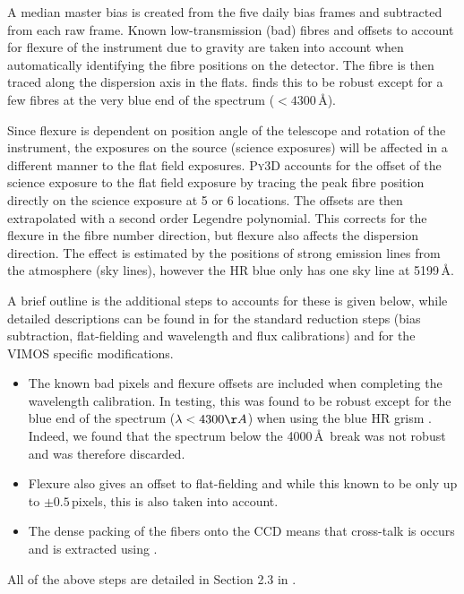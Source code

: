 		A median master bias is created from the five daily bias frames and subtracted from each raw frame. Known low-transmission (bad) fibres and offsets to account for flexure of the instrument due to gravity are taken into account when automatically identifying the fibre positions on the detector. The fibre is then traced along the dispersion axis in the flats. \citet{Husemann2014} finds this to be robust except for a few fibres at the very blue end of the spectrum ($<4300$\,\AA). 

		Since flexure is dependent on position angle of the telescope and rotation of the instrument, the exposures on the source (science exposures) will be affected in a different manner to the flat field exposures. \textsc{Py3D} accounts for the offset of the science exposure to the flat field exposure by tracing the peak fibre position directly on the science exposure at 5 or 6 locations. The offsets are then extrapolated with a second order Legendre polynomial. This corrects for the flexure in the fibre number direction, but flexure also affects the dispersion direction. The effect is estimated by the positions of strong emission lines from the atmosphere (sky lines), however the HR blue only has one sky line at 5199\,\AA. 










		A brief outline is the additional steps to accounts for these is given below, while detailed descriptions can be found in \citet{Sanchez2012} for the standard reduction steps (bias subtraction, flat-fielding and wavelength and flux calibrations) and \citep{Husemann2014} for the VIMOS specific modifications. 
		\begin{itemize}
		\item The known bad pixels and flexure offsets are included when completing the wavelength calibration. In testing, this was found to be robust except for the blue end of the spectrum ($\lambda < 4300 \AA$) when using the blue HR grism \citep{Husemann2014}. Indeed, we found that the spectrum below the 4000\,\AA\ break was not robust and was therefore discarded.
		\item Flexure also gives an offset to flat-fielding and while this known to be only up to $\pm0.5$\,pixels, this is also taken into account.
		\item The dense packing of the fibers onto the CCD means that cross-talk is occurs and is extracted using \citep{Horne1986}. 
		\end{itemize}
		All of the above steps are detailed in Section 2.3 in \citet{Husemann2014}.

